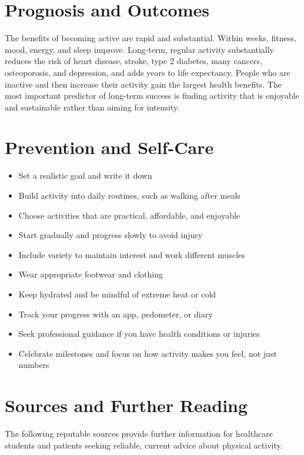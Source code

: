 \section*{Prognosis and Outcomes}
The benefits of becoming active are rapid and substantial. Within weeks, fitness, mood, energy, and sleep improve. Long-term, regular activity substantially reduces the risk of heart disease, stroke, type 2 diabetes, many cancers, osteoporosis, and depression, and adds years to life expectancy. People who are inactive and then increase their activity gain the largest health benefits. The most important predictor of long-term success is finding activity that is enjoyable and sustainable rather than aiming for intensity.

\section*{Prevention and Self-Care}
\begin{itemize}
    \item Set a realistic goal and write it down
    \item Build activity into daily routines, such as walking after meals
    \item Choose activities that are practical, affordable, and enjoyable
    \item Start gradually and progress slowly to avoid injury
    \item Include variety to maintain interest and work different muscles
    \item Wear appropriate footwear and clothing
    \item Keep hydrated and be mindful of extreme heat or cold
    \item Track your progress with an app, pedometer, or diary
    \item Seek professional guidance if you have health conditions or injuries
    \item Celebrate milestones and focus on how activity makes you feel, not just numbers
\end{itemize}

\section*{Sources and Further Reading}
The following reputable sources provide further information for healthcare students and patients seeking reliable, current advice about physical activity.

